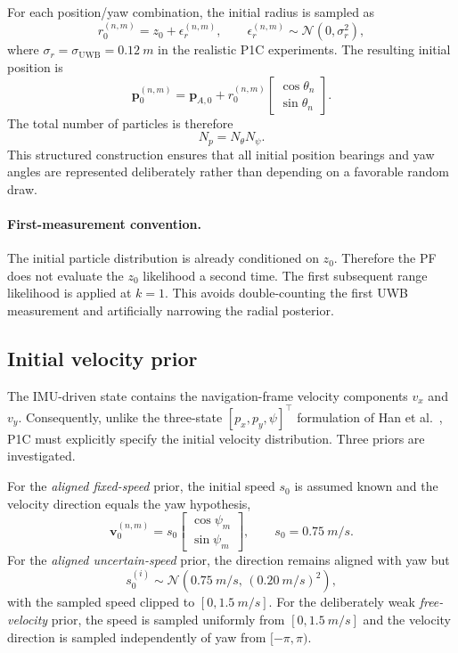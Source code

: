 For each position/yaw combination, the initial radius is sampled as
\begin{equation}
r_0^{(n,m)}=z_0+\epsilon_r^{(n,m)},
\qquad
\epsilon_r^{(n,m)}\sim\mathcal N(0,\sigma_r^2),
\end{equation}
where $\sigma_r=\sigma_{\mathrm{UWB}}=\SI{0.12}{m}$ in the realistic P1C experiments. The resulting initial position is
\begin{equation}
\bm p_0^{(n,m)}=
\bm p_{A,0}+r_0^{(n,m)}
\begin{bmatrix}
\cos\theta_n\\
\sin\theta_n
\end{bmatrix}.
\end{equation}
The total number of particles is therefore
\begin{equation}
N_p=N_{\theta}N_{\psi}.
\end{equation}
This structured construction ensures that all initial position bearings and yaw angles are represented deliberately rather than depending on a favorable random draw.

\paragraph{First-measurement convention.}
The initial particle distribution is already conditioned on $z_0$. Therefore the PF does not evaluate the $z_0$ likelihood a second time. The first subsequent range likelihood is applied at $k=1$. This avoids double-counting the first UWB measurement and artificially narrowing the radial posterior.

\subsection{Initial velocity prior}
The IMU-driven state contains the navigation-frame velocity components $v_x$ and $v_y$. Consequently, unlike the three-state $[p_x,p_y,\psi]^\top$ formulation of Han et al.\ \cite{han2020cooperative}, P1C must explicitly specify the initial velocity distribution. Three priors are investigated.

For the \emph{aligned fixed-speed} prior, the initial speed $s_0$ is assumed known and the velocity direction equals the yaw hypothesis,
\begin{equation}
\bm v_0^{(n,m)}=s_0
\begin{bmatrix}
\cos\psi_m\\
\sin\psi_m
\end{bmatrix},
\qquad s_0=\SI{0.75}{m/s}.
\end{equation}
For the \emph{aligned uncertain-speed} prior, the direction remains aligned with yaw but
\begin{equation}
s_0^{(i)}\sim\mathcal N(\SI{0.75}{m/s},\,(\SI{0.20}{m/s})^2),
\end{equation}
with the sampled speed clipped to $[0,\SI{1.5}{m/s}]$. For the deliberately weak \emph{free-velocity} prior, the speed is sampled uniformly from $[0,\SI{1.5}{m/s}]$ and the velocity direction is sampled independently of yaw from $[-\pi,\pi)$.

